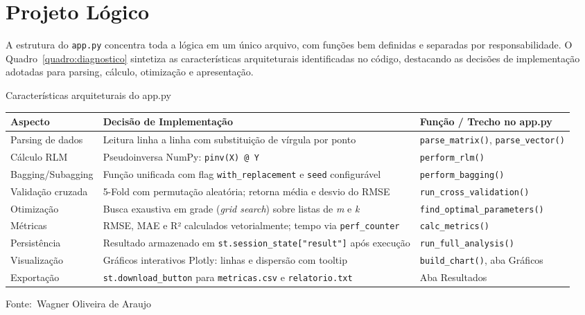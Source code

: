 \documentclass[12pt,a4paper]{article}
\newcommand{\oautor}{Wagner Oliveira de Araujo}
\begin{document}
\section{Projeto Lógico}

A estrutura do \texttt{app.py} concentra toda a lógica em um único arquivo, com funções bem definidas e separadas por responsabilidade. O Quadro~\ref{quadro:diagnostico} sintetiza as características arquiteturais identificadas no código, destacando as decisões de implementação adotadas para parsing, cálculo, otimização e apresentação.

\begin{quadro}[ht]
\centering
\small
\caption{Características arquiteturais do app.py}
\label{quadro:diagnostico}
\begin{threeparttable}
\begin{tabularx}{\textwidth}{|l|X|X|} \hline
\textbf{Aspecto} & \textbf{Decisão de Implementação} & \textbf{Função / Trecho no app.py} \\ \hline
Parsing de dados & Leitura linha a linha com substituição de vírgula por ponto & \texttt{parse\_matrix()}, \texttt{parse\_vector()} \\ \hline
Cálculo RLM & Pseudoinversa NumPy: \texttt{pinv(X) @ Y} & \texttt{perform\_rlm()} \\ \hline
Bagging/Subagging & Função unificada com flag \texttt{with\_replacement} e \texttt{seed} configurável & \texttt{perform\_bagging()} \\ \hline
Validação cruzada & 5-Fold com permutação aleatória; retorna média e desvio do RMSE & \texttt{run\_cross\_validation()} \\ \hline
Otimização & Busca exaustiva em grade (\textit{grid search}) sobre listas de \textit{m} e \textit{k} & \texttt{find\_optimal\_parameters()} \\ \hline
Métricas & RMSE, MAE e R² calculados vetorialmente; tempo via \texttt{perf\_counter} & \texttt{calc\_metrics()} \\ \hline
Persistência & Resultado armazenado em \texttt{st.session\_state["result"]} após execução & \texttt{run\_full\_analysis()} \\ \hline
Visualização & Gráficos interativos Plotly: linhas e dispersão com tooltip & \texttt{build\_chart()}, aba Gráficos \\ \hline
Exportação & \texttt{st.download\_button} para \texttt{metricas.csv} e \texttt{relatorio.txt} & Aba Resultados \\ \hline
\end{tabularx}
\begin{tablenotes}[flushleft]
\footnotesize
\item Fonte:~\oautor
\end{tablenotes}
\end{threeparttable}
\end{quadro}
\end{document}
